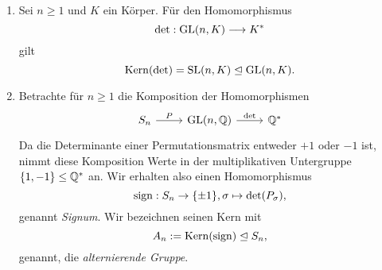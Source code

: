 \documentclass{book}
\begin{document}
\begin{exas}
    \label{exas:kern}
    \begin{enumerate}
        \item {}Sei $n \ge 1$ und $K$ ein Körper. Für den Homomorphismus
            \[
                \det: \operatorname{GL}(n,K) \longrightarrow K^*
            \]
            gilt
            \[
                \operatorname{Kern}(\det) = \operatorname{SL}(n,K) \trianglelefteq \operatorname{GL}(n,K).
            \]
        \item Betrachte für $n \ge 1$ die Komposition der Homomorphismen
            \[
            \begin{tikzcd}
                S_n \ar{r}{P} & \GL(n,\QQ) \ar{r}{\det} & \QQ^*
            \end{tikzcd}
            \]
            Da die Determinante einer Permutationsmatrix entweder $+1$ oder
            $-1$ ist, nimmt diese Komposition Werte in der multiplikativen
            Untergruppe $\{1,-1\} \le \mathbb{Q}^*$ an. Wir erhalten also
            einen Homomorphismus
            \[
                \operatorname{sign}: S_n \to \{\pm 1\}, \sigma \mapsto \det(P_{\sigma}),
            \]
            genannt \emph{Signum}. Wir bezeichnen seinen Kern mit
            \[
                A_n := \operatorname{Kern}(\operatorname{sign}) \trianglelefteq S_n,
            \]
            genannt, die \emph{alternierende Gruppe}.
    \end{enumerate}
\end{exas}
\end{document}

